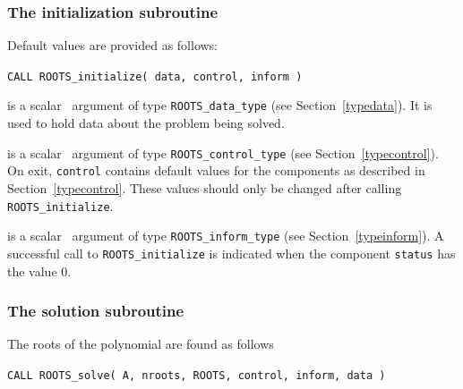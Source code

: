 \documentclass{galahad}
\newcommand{\packagename}{ROOTS}
\begin{document}

\subsubsection{The initialization subroutine}\label{subinit}
 Default values are provided as follows:
\vspace*{1mm}

\hspace{8mm}
{\tt CALL \packagename\_initialize( data, control, inform )}

\vspace*{-3mm}
\begin{description}

 is a scalar \intentinout\ argument of type 
{\tt \packagename\_data\_type}
(see Section~\ref{typedata}). It is used to hold data about the problem being 
solved. 

 is a scalar \intentout\ argument of type 
{\tt \packagename\_control\_type}
(see Section~\ref{typecontrol}). 
On exit, {\tt control} contains default values for the components as
described in Section~\ref{typecontrol}.
These values should only be changed after calling 
{\tt \packagename\_initialize}.

 is a scalar \intentout\ argument of type 
{\tt \packagename\_inform\_type}
(see Section~\ref{typeinform}). A successful call to
{\tt \packagename\_initialize}
is indicated when the  component {\tt status} has the value 0. 

\end{description}



\subsubsection{The solution subroutine}
The roots of the polynomial  are found as follows
\vspace*{1mm}

\hspace{8mm}
{\tt CALL \packagename\_solve( A, nroots, ROOTS, control, inform, data )}
\end{document}
